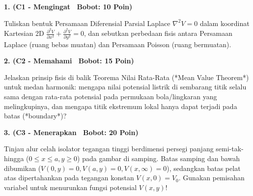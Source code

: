 \documentclass[10pt,a4paper]{article}
\begin{document}
\par
\vspace{1mm}

\noindent\textbf{1. (C1 - Mengingat \textbar\ Bobot: 10 Poin)}\par\vspace{0.8mm}
{\footnotesize Tuliskan bentuk Persamaan Diferensial Parsial Laplace $\nabla^2 V = 0$ dalam koordinat Kartesian 2D $\frac{\partial^2 V}{\partial x^2} + \frac{\partial^2 V}{\partial y^2} = 0$, dan sebutkan perbedaan fisis antara Persamaan Laplace (ruang bebas muatan) dan Persamaan Poisson (ruang bermuatan).}\par

\vspace{2.5mm}

\noindent\textbf{2. (C2 - Memahami \textbar\ Bobot: 15 Poin)}\par\vspace{0.8mm}
{\footnotesize Jelaskan prinsip fisis di balik Teorema Nilai Rata-Rata (*Mean Value Theorem*) untuk medan harmonik: mengapa nilai potensial listrik di sembarang titik selalu sama dengan rata-rata potensial pada permukaan bola/lingkaran yang melingkupinya, dan mengapa titik ekstremum lokal hanya dapat terjadi pada batas (*boundary*)?}\par

\vspace{2.5mm}

\noindent\textbf{3. (C3 - Menerapkan \textbar\ Bobot: 20 Poin)}\par\vspace{0.8mm}
\noindent\begin{minipage}[t]{0.60\textwidth}%
  {\footnotesize Tinjau alur celah isolator tegangan tinggi berdimensi persegi panjang semi-tak-hingga ($0 \le x \le a, y \ge 0$) pada gambar di samping. Batas samping dan bawah dibumikan ($V(0,y) = 0, V(a,y) = 0, V(x,\infty) = 0$), sedangkan batas pelat atas dipertahankan pada tegangan konstan $V(x,0) = V_0$. Gunakan pemisahan variabel untuk menurunkan fungsi potensial $V(x,y)$!}%
\end{minipage}%
\hfill%
\begin{minipage}[t]{0.37\textwidth}%
  \centering
\end{minipage}\par
\end{document}
